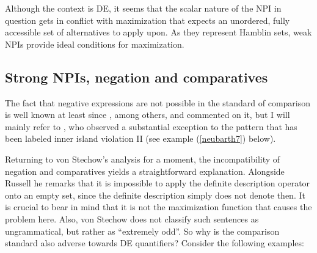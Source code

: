 \documentclass[output=paper,colorlinks,citecolor=brown,
]{langscibook}
\begin{document}
\begin{exe}
\end{exe}

Although the context is DE, it seems that the scalar nature of the NPI in question gets in conflict with maximization
that expects an unordered, fully accessible set of alternatives to apply upon. As they represent Hamblin sets, weak NPIs provide ideal conditions for maximization.

\subsection{Strong NPIs, negation and comparatives}

The fact that negative expressions are not possible in the standard of comparison is well known at least since \citet{lees1961}, among others, \citet{ross1980} and \citet{stechow1984} commented on it, but I will mainly refer to \citet{lechner2002}, who observed a substantial exception to the pattern that has been labeled inner island violation II (see example (\ref{neubarth7}) below).

\begin{sloppypar}
Returning to von Stechow’s analysis for a moment, the incompatibility of negation and comparatives yields a straightforward explanation.
Alongside Russell he remarks that it is impossible to apply the definite description operator onto an empty set, since the definite description simply does not denote then. 
It is crucial to bear in mind that it is not the maximization function that causes the problem here.
Also, von Stechow does not classify such sentences as ungrammatical, but rather as “extremely odd”. So why is the comparison standard also adverse towards DE quantifiers? Consider the following examples:
\end{sloppypar}

  \begin{exe}
    \ex\label{neubarthex:standardofcomp}
    \begin{xlist}
    \end{xlist}
  \end{exe}
\end{document}
